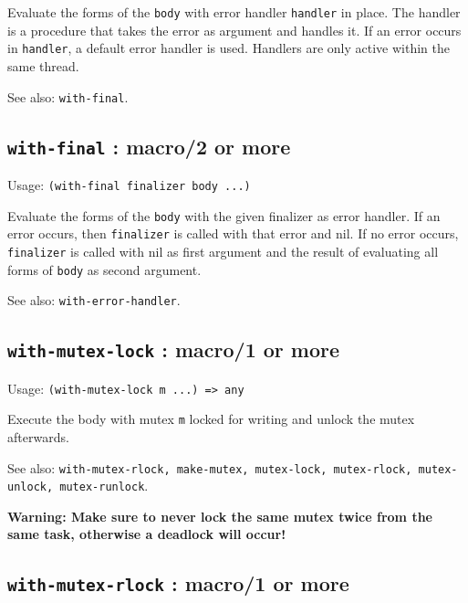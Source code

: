 \documentclass[
]{article}
\newcommand{\passthrough}[1]{#1}
\begin{document}
Evaluate the forms of the \passthrough{\lstinline!body!} with error
handler \passthrough{\lstinline!handler!} in place. The handler is a
procedure that takes the error as argument and handles it. If an error
occurs in \passthrough{\lstinline!handler!}, a default error handler is
used. Handlers are only active within the same thread.

See also: \passthrough{\lstinline!with-final!}.

\hypertarget{with-final-macro2-or-more-1}{%
\subsection{\texorpdfstring{\texttt{with-final} : macro/2 or
more}{with-final : macro/2 or more}}\label{with-final-macro2-or-more-1}}

Usage: \passthrough{\lstinline!(with-final finalizer body ...)!}

Evaluate the forms of the \passthrough{\lstinline!body!} with the given
finalizer as error handler. If an error occurs, then
\passthrough{\lstinline!finalizer!} is called with that error and nil.
If no error occurs, \passthrough{\lstinline!finalizer!} is called with
nil as first argument and the result of evaluating all forms of
\passthrough{\lstinline!body!} as second argument.

See also: \passthrough{\lstinline!with-error-handler!}.

\hypertarget{with-mutex-lock-macro1-or-more}{%
\subsection{\texorpdfstring{\texttt{with-mutex-lock} : macro/1 or
more}{with-mutex-lock : macro/1 or more}}\label{with-mutex-lock-macro1-or-more}}

Usage: \passthrough{\lstinline!(with-mutex-lock m ...) => any!}

Execute the body with mutex \passthrough{\lstinline!m!} locked for
writing and unlock the mutex afterwards.

See also:
\passthrough{\lstinline!with-mutex-rlock, make-mutex, mutex-lock, mutex-rlock, mutex-unlock, mutex-runlock!}.

\textbf{Warning: Make sure to never lock the same mutex twice from the
same task, otherwise a deadlock will occur!}

\hypertarget{with-mutex-rlock-macro1-or-more-1}{%
\subsection{\texorpdfstring{\texttt{with-mutex-rlock} : macro/1 or
more}{with-mutex-rlock : macro/1 or more}}\label{with-mutex-rlock-macro1-or-more-1}}
\end{document}
